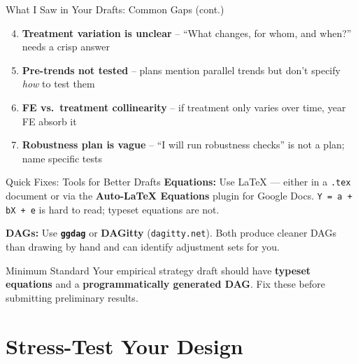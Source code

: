 \begin{frame}{What I Saw in Your Drafts: Common Gaps (cont.)}
  \begin{enumerate}
    \setcounter{enumi}{3}
    \item \textbf{Treatment variation is unclear} -- ``What changes, for whom, and when?'' needs a crisp answer
    \item \textbf{Pre-trends not tested} -- plans mention parallel trends but don't specify \textit{how} to test them
    \item \textbf{FE vs.\ treatment collinearity} -- if treatment only varies over time, year FE absorb it
    \item \textbf{Robustness plan is vague} -- ``I will run robustness checks'' is not a plan; name specific tests
  \end{enumerate}

\end{frame}

\begin{frame}{Quick Fixes: Tools for Better Drafts}
  \textbf{Equations:} Use \LaTeX{} --- either in a \texttt{.tex} document or via the \textbf{Auto-\LaTeX{} Equations} plugin for Google Docs. \texttt{Y = a + bX + e} is hard to read; typeset equations are not.

  \vspace{8pt}

  \textbf{DAGs:} Use \textbf{\texttt{ggdag}} or \textbf{DAGitty} (\texttt{dagitty.net}). Both produce cleaner DAGs than drawing by hand and can identify adjustment sets for you.

  \vspace{8pt}

  \begin{block}{Minimum Standard}
    Your empirical strategy draft should have \textbf{typeset equations} and a \textbf{programmatically generated DAG}. Fix these before submitting preliminary results.
  \end{block}
\end{frame}


\section{Stress-Test Your Design}

